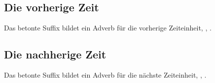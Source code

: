 \subsection{Die vorherige Zeit} Das betonte Suffix  bildet ein Adverb für die vorherige Zeiteinheit,  ,  .

\subsection{Die nachherige Zeit} Das betonte Suffix  bildet ein Adverb für die nächste Zeiteinheit,  ,  .
